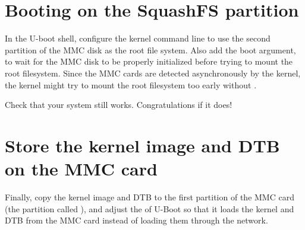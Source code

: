 \section{Booting on the SquashFS partition}

In the U-boot shell, configure the kernel command line to use the
second partition of the MMC disk as the root file system. Also add the
 boot argument, to wait for the MMC disk to be properly
initialized before trying to mount the root filesystem. Since the MMC
cards are detected asynchronously by the kernel, the kernel might try
to mount the root filesystem too early without .

Check that your system still works. Congratulations if it does!

\section{Store the kernel image and DTB on the MMC card}

Finally, copy the  kernel image and DTB to the first partition of
the MMC card (the partition called ), and adjust the
 of U-Boot so that it loads the kernel and DTB from the MMC card
instead of loading them through the network.
